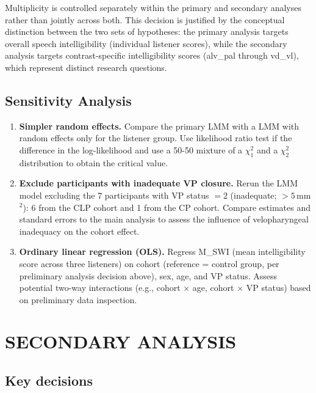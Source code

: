 \documentclass{article}
\begin{document}
\noindent Multiplicity is controlled separately within the primary and secondary analyses rather than jointly across both. This decision is justified by the conceptual distinction between the two sets of hypotheses: the primary analysis targets overall speech intelligibility (individual listener scores), 
while the secondary analysis targets contrast-specific intelligibility scores 
(alv\_pal through vd\_vl), which represent distinct research questions. 

\subsection*{Sensitivity Analysis}\label{sec:sensitivity}

\begin{enumerate}

    \item \textbf{Simpler random effects.} Compare the primary LMM with a LMM with random effects only for the listener group. Use likelihood ratio test if the difference in the log-likelihood and use a 50-50 mixture of a $\chi^2_1$ and a $\chi^2_2$ distribution to obtain the critical value.  

    \item \textbf{Exclude participants with inadequate VP closure.} Rerun the LMM model excluding the 7 participants with VP status $= 2$ (inadequate; $>5$\,mm$^2$): 6 from the CLP cohort and 1 from the CP cohort. Compare estimates and standard errors to the main analysis to assess the influence of velopharyngeal inadequacy on the cohort effect.

    \item \textbf{Ordinary linear regression (OLS).} Regress M\_SWI (mean intelligibility score across three listeners) on cohort (reference = control group, per preliminary analysis decision above), sex, age, and VP status. Assess potential two-way interactions (e.g., cohort $\times$ age, cohort $\times$ VP status) based on preliminary data inspection.

\end{enumerate}

\section*{SECONDARY ANALYSIS}\label{sec:secondary}
\subsection*{Key decisions}\label{sec:secondary-decisions}
\end{document}
